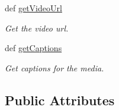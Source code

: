 \begin{DoxyCompactItemize}
def \hyperlink{class_sbs_on_demand_1_1_media_1_1_media_a86015bb05666a5def450678728d8f96e}{get\-Video\-Url}
\begin{DoxyCompactList}\small\item\em \-Get the video url. \end{DoxyCompactList}\item 
def \hyperlink{class_sbs_on_demand_1_1_media_1_1_media_abfef7f272342f3eeeb78746725968762}{get\-Captions}
\begin{DoxyCompactList}\small\item\em \-Get captions for the media. \end{DoxyCompactList}\end{DoxyCompactItemize}
\subsection*{\-Public \-Attributes}
